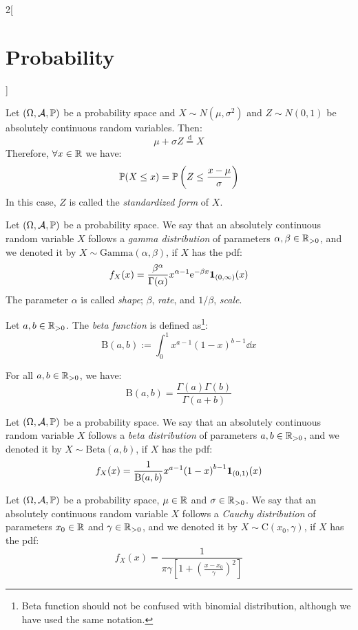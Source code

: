 \documentclass[../../../main.tex]{subfiles}
\begin{document}
\begin{multicols}{2}[\section{Probability}]
\begin{center}
\begin{minipage}{\linewidth}
      \centering
      
    \end{minipage}
  \end{center}
  \begin{proposition}
    Let $(\Omega,\mathcal{A},\mathbb{P})$ be a probability space and $X\sim N(\mu,\sigma^2)$ and $Z\sim N(0,1)$ be absolutely continuous random variables. Then: $$\mu+\sigma Z\overset{\text{d}}{=} X$$ Therefore, $\forall x\in\mathbb{R}$ we have: $$\mathbb{P}(X\leq x)=\mathbb{P}\left(Z\leq\frac{x-\mu}{\sigma}\right)$$ In this case, $Z$ is called the \emph{standardized form} of $X$.
  \end{proposition}
  \begin{definition}
    Let $(\Omega,\mathcal{A},\mathbb{P})$ be a probability space. We say that an absolutely continuous random variable $X$ follows a \emph{gamma distribution} of parameters $\alpha,\beta\in\mathbb{R}_{>0}$, and we denoted it by $X\sim \text{Gamma}(\alpha,\beta)$, if $X$ has the pdf: $$f_X(x)=\frac{\beta^\alpha}{\Gamma(\alpha)}x^{\alpha-1}\mathrm{e}^{-\beta x}\boldsymbol{\mathrm{1}}_{(0,\infty)}(x)$$
    The parameter $\alpha$ is called \emph{shape}; $\beta$, \emph{rate}, and $1/\beta$, \emph{scale}.
  \end{definition}
  \begin{definition}
    Let $a,b\in\mathbb{R}_{>0}$. The \emph{beta function} is defined as\footnote{Beta function should not be confused with binomial distribution, although we have used the same notation.}: $$\text{B}(a,b):=\int_0^1x^{a-1}{(1-x)}^{b-1}\dd{x}$$
  \end{definition}
  \begin{proposition}
    For all $a,b\in\mathbb{R}_{>0}$, we have: $$\text{B}(a,b)=\frac{\Gamma(a)\Gamma(b)}{\Gamma(a+b)}$$
  \end{proposition}
  \begin{definition}
    Let $(\Omega,\mathcal{A},\mathbb{P})$ be a probability space. We say that an absolutely continuous random variable $X$ follows a \emph{beta distribution} of parameters $a,b\in\mathbb{R}_{>0}$, and we denoted it by $X\sim \text{Beta}(a,b)$, if $X$ has the pdf: $$f_X(x)=\frac{1}{\text{B}(a,b)}x^{a-1}{(1-x)}^{b-1}\boldsymbol{\mathrm{1}}_{(0,1)}(x)$$
  \end{definition}
  \begin{definition}
    Let $(\Omega,\mathcal{A},\mathbb{P})$ be a probability space, $\mu\in\mathbb{R}$ and $\sigma\in\mathbb{R}_{>0}$. We say that an absolutely continuous random variable $X$ follows a \emph{Cauchy distribution} of parameters $x_0\in\mathbb{R}$ and $\gamma\in\mathbb{R}_{>0}$, and we denoted it by $X\sim \text{C}(x_0,\gamma)$, if $X$ has the pdf: $$f_X(x)=\frac{1}{\pi\gamma\left[1+{\left(\frac{x-x_0}{\gamma}\right)}^2\right]}$$

\end{definition}
\end{multicols}
\end{document}

